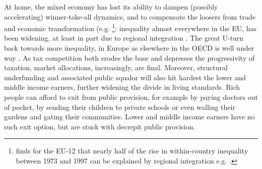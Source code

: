\documentclass[11pt,a4paper,oneside]{article}
\begin{document}
At home, the mixed economy has lost its ability to dampen (possibly accelerating) winner-take-all dynamics, and to compensate the loosers from trade and economic transformation (e.g. \citealt{Beckfield2006}
	\footnote{
		\citeauthor{Beckfield2006} finds for the \gls{EU}-12 that nearly half of the rise in within-country inequality between 1973 and 1997 can be explained by regional integration e.g. \citeyearpar[979]{Beckfield2006}.
	}:
inequality almost everywhere in the \gls{EU}, has been widening, at least in part due to regional integration \citep[e.g.][265]{DaudUngl2008}.
The great U-turn back towards more inequality, in Europe as elsewhere in the \gls{OECD} is well under way \citep{AldersonNielsen-2002-aa}.
As tax competition both erodes the base and depresses the progressivity of taxation, market allocations, increasingly, are final.
Moreover, structural underfunding and associated public squalor will also hit hardest the lower and middle income earners, further widening the divide in living standards.
Rich people can afford to exit from public provision, for example by paying doctors out of pocket, by sending their children to private schools or even walling their gardens and gating their communities.
Lower and middle income earners have no such exit option, but are stuck with decrepit public provision.
\end{document}

